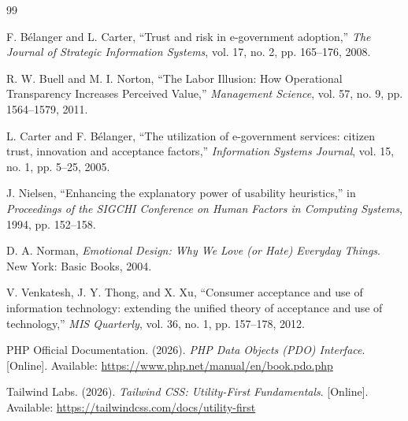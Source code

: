 \documentclass[journal, 10pt, twoside]{IEEEtran}
\begin{document}

\begin{thebibliography}{99}

  F. Bélanger and L. Carter,
  ``Trust and risk in e-government adoption,''
  \textit{The Journal of Strategic Information Systems}, vol. 17, no. 2, pp. 165--176, 2008.

  R. W. Buell and M. I. Norton,
  ``The Labor Illusion: How Operational Transparency Increases Perceived Value,''
  \textit{Management Science}, vol. 57, no. 9, pp. 1564--1579, 2011.

  L. Carter and F. Bélanger,
  ``The utilization of e-government services: citizen trust, innovation and acceptance factors,''
  \textit{Information Systems Journal}, vol. 15, no. 1, pp. 5--25, 2005.

  J. Nielsen,
  ``Enhancing the explanatory power of usability heuristics,''
  in \textit{Proceedings of the SIGCHI Conference on Human Factors in Computing Systems}, 1994, pp. 152--158.

  D. A. Norman,
  \textit{Emotional Design: Why We Love (or Hate) Everyday Things}.
  New York: Basic Books, 2004.

  V. Venkatesh, J. Y. Thong, and X. Xu,
  ``Consumer acceptance and use of information technology: extending the unified theory of acceptance and use of technology,''
  \textit{MIS Quarterly}, vol. 36, no. 1, pp. 157--178, 2012.

  PHP Official Documentation. (2026).
  \textit{PHP Data Objects (PDO) Interface}.
  [Online]. Available: \url{https://www.php.net/manual/en/book.pdo.php}

  Tailwind Labs. (2026).
  \textit{Tailwind CSS: Utility-First Fundamentals}.
  [Online]. Available: \url{https://tailwindcss.com/docs/utility-first}

\end{thebibliography}
\end{document}
